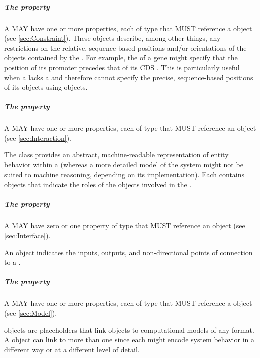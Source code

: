 \subparagraph{The  property}
\label{sec:hasConstraint}

A  MAY have one or more  properties, each of type  that MUST reference a  object (see \ref{sec:Constraint}).  These objects describe, among other things, any restrictions on the relative, sequence-based positions and/or orientations of the  objects contained by the .
For example, the  of a gene might specify that the position of its promoter  precedes that of its CDS . This is particularly useful when a  lacks a  and therefore cannot specify the precise, sequence-based positions of its  objects using  objects.

\subparagraph{The  property}\label{sec:hasInteraction}

A  MAY have one or more  properties, each of type  that MUST reference an  object (see \ref{sec:Interaction}).  

The  class provides an abstract, machine-readable representation of entity behavior within a  (whereas a more detailed model of the system might not be suited to machine reasoning, depending on its implementation).
Each  contains  objects that indicate the roles of the  objects involved in the .

\subparagraph{The  property}\label{sec:hasInterface}

A  MAY have zero or one  property of type  that MUST reference an  object (see \ref{sec:Interface}).  

An  object indicates the inputs, outputs, and non-directional points of connection to a .

\subparagraph{The  property}\label{sec:hasModel}

A  MAY have one or more  properties, each of type  that MUST reference a  object (see \ref{sec:Model}).  

 objects are placeholders that link  objects to computational models of any format.
A  object can link to more than one  since each might encode system behavior in a different way or at a different level of detail.














